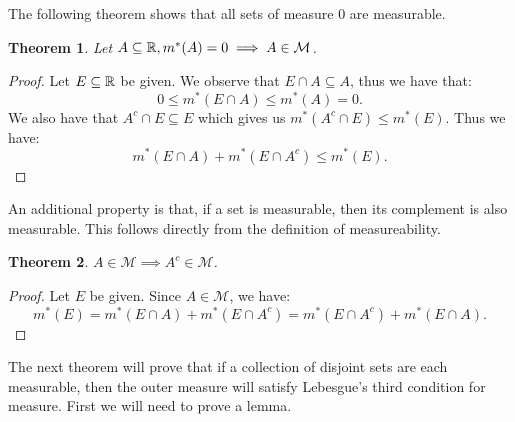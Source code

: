 \documentclass{article}
\newtheorem{theorem}{Theorem}
\theoremstyle{axiom} \newtheorem{axiom}{Axiom}
\theoremstyle{definition} \newtheorem{definition}{Definition}
\theoremstyle{example} \newtheorem{example}{Example}
\theoremstyle{proposition} \newtheorem{prop}{Proposition}
\theoremstyle{lemma} \newtheorem{lemma}{Lemma}
\newcommand{\sM}{\mathcal{M}}  \newcommand{\sN}{\mathcal{N}}
\begin{document}
The following theorem shows that all sets of measure $0$ are measurable. 
\begin{theorem} \label{thm:zerosets}
	Let $A\subseteq \R, m^*(A) = 0 \implies A \in \sM$.
\end{theorem}
\begin{proof}
	Let $E\subseteq \mathbb{R}$ be given. We observe that $E\cap A \subseteq A$, thus
	we have that: 
	\begin{equation*}
		0\leq m^*(E\cap A) \leq m^*(A) = 0.
	\end{equation*}
	We also have that $A^c \cap E \subseteq E$ which gives us $m^*(A^c\cap E) \leq m^*(E)$.
	Thus we have:
	\begin{equation*}
		m^*(E\cap A) +m^*(E\cap A^c) \leq m^*(E).
	\end{equation*}
\end{proof}

An additional property is that, if a set is measurable, then its complement is
also measurable. This follows directly from the definition of measureability.
\begin{theorem} \label{thm:complement}
	$A \in \sM \implies A^c \in \sM$.
\end{theorem}
\begin{proof}
	Let $E$ be given. Since $A \in \sM$, we have:
	\begin{equation}
		m^*(E) = m^*(E\cap A) +m^*(E\cap A^c) =  m^*(E\cap A^c) +m^*(E\cap A).
	\end{equation}
\end{proof}

The next theorem will prove that if a collection of disjoint sets are each
measurable, then the outer measure will satisfy Lebesgue's third condition 
for measure. First we will need to prove a lemma.
\end{document}
